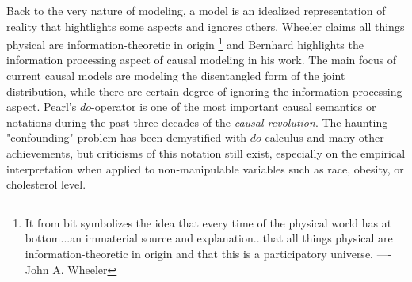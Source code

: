  
Back to the very nature of modeling, a model is an idealized representation of reality that hightlights some aspects and ignores others. Wheeler claims all things physical are information-theoretic in origin \footnote{It from bit symbolizes the idea that every time of the physical world has at bottom...an immaterial source and explanation...that all things physical are information-theoretic in origin and that this is a participatory universe. ---- John A. Wheeler} and Bernhard highlights the information processing aspect of causal modeling in his work\cite{Scholkopf2019}. The main focus of current causal models are modeling the disentangled form of the joint distribution, while there are certain degree of ignoring the information processing aspect. Pearl's $do$-operator is one of the most important causal semantics or notations during the past three decades of the \emph{causal revolution}.  The haunting "confounding" problem has been demystified with $do$-calculus and many other achievements, but criticisms of this notation still exist, especially on the empirical interpretation when applied to non-manipulable variables such as race, obesity, or cholesterol level\cite{Pearl2019do}.

